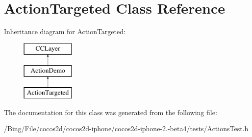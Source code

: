 \hypertarget{interface_action_targeted}{\section{Action\-Targeted Class Reference}
\label{interface_action_targeted}
}
Inheritance diagram for Action\-Targeted\-:\begin{figure}[H]
\begin{center}
\leavevmode
\includegraphics[height=3.000000cm]{interface_action_targeted}
\end{center}
\end{figure}


The documentation for this class was generated from the following file\-:\begin{DoxyCompactItemize}
\item 
/\-Bing/\-File/cocos2d/cocos2d-\/iphone/cocos2d-\/iphone-\/2.-\/beta4/tests/Actions\-Test.\-h\end{DoxyCompactItemize}
